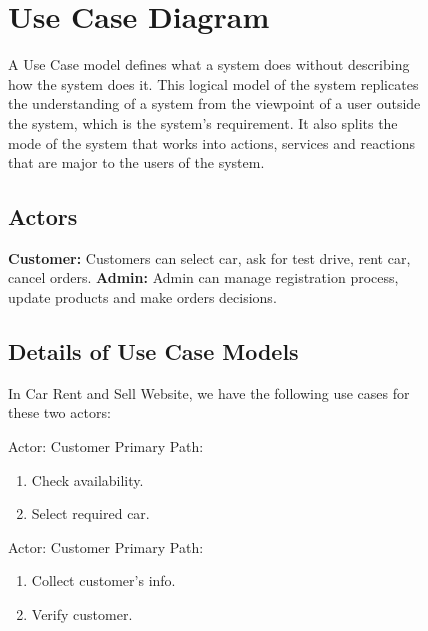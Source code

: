 \noindent 

\noindent 


\begin{figure}

\section{Use Case Diagram}

\noindent A Use Case model defines what a system does without describing how the system does it. This logical model of the system replicates the understanding of a system from the viewpoint of a user outside the system, which is the system's requirement. It also splits the mode of the system that works into actions, services and reactions that are major to the users of the system.


\subsection{Actors}

\textbf{Customer: }Customers can select car, ask for test drive, rent car, cancel orders.\newline
\textbf{Admin: }Admin can manage registration process, update products and make orders decisions.

\subsection{Details of Use Case Models}

\noindent In Car Rent and Sell Website, we have the following use cases for these two actors:

\noindent \textbf{}

\noindent Actor: Customer
\noindent Primary Path:

\begin{enumerate}
\item  Check availability.

\item  Select required car. 
\end{enumerate}

\noindent \textbf{}

\noindent Actor: Customer
\noindent Primary Path:

\begin{enumerate}
\item  Collect customer’s info.

\item  Verify customer. 
\end{enumerate}


\end{figure}
